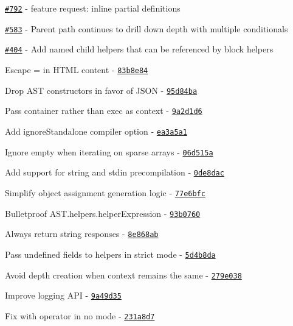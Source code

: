 \begin{DoxyItemize}
\item \href{https://github.com/wycats/handlebars.js/issues/792}{\tt \#792} -\/ feature request\+: inline partial definitions
\item \href{https://github.com/wycats/handlebars.js/issues/583}{\tt \#583} -\/ Parent path continues to drill down depth with multiple conditionals
\item \href{https://github.com/wycats/handlebars.js/issues/404}{\tt \#404} -\/ Add named child helpers that can be referenced by block helpers
\item Escape = in H\+T\+M\+L content -\/ \href{https://github.com/wycats/handlebars.js/commit/83b8e84}{\tt 83b8e84}
\item Drop A\+S\+T constructors in favor of J\+S\+O\+N -\/ \href{https://github.com/wycats/handlebars.js/commit/95d84ba}{\tt 95d84ba}
\item Pass container rather than exec as context -\/ \href{https://github.com/wycats/handlebars.js/commit/9a2d1d6}{\tt 9a2d1d6}
\item Add ignore\+Standalone compiler option -\/ \href{https://github.com/wycats/handlebars.js/commit/ea3a5a1}{\tt ea3a5a1}
\item Ignore empty when iterating on sparse arrays -\/ \href{https://github.com/wycats/handlebars.js/commit/06d515a}{\tt 06d515a}
\item Add support for string and stdin precompilation -\/ \href{https://github.com/wycats/handlebars.js/commit/0de8dac}{\tt 0de8dac}
\item Simplify object assignment generation logic -\/ \href{https://github.com/wycats/handlebars.js/commit/77e6bfc}{\tt 77e6bfc}
\item Bulletproof A\+S\+T.\+helpers.\+helper\+Expression -\/ \href{https://github.com/wycats/handlebars.js/commit/93b0760}{\tt 93b0760}
\item Always return string responses -\/ \href{https://github.com/wycats/handlebars.js/commit/8e868ab}{\tt 8e868ab}
\item Pass undefined fields to helpers in strict mode -\/ \href{https://github.com/wycats/handlebars.js/commit/5d4b8da}{\tt 5d4b8da}
\item Avoid depth creation when context remains the same -\/ \href{https://github.com/wycats/handlebars.js/commit/279e038}{\tt 279e038}
\item Improve logging A\+P\+I -\/ \href{https://github.com/wycats/handlebars.js/commit/9a49d35}{\tt 9a49d35}
\item Fix with operator in no  mode -\/ \href{https://github.com/wycats/handlebars.js/commit/231a8d7}{\tt 231a8d7}

\end{DoxyItemize}
